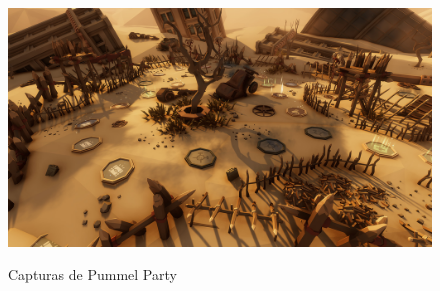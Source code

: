 \begin{figure}[H]
    \centering
    \begin{minipage}{0.40\textwidth}
        \centering
        \includegraphics[width=1.0\textwidth]{5-Cuerpo/Chapter3/PMP3.jpg} %
        \label{PMP-Paisaje}
    \end{minipage}
    \caption{Capturas de Pummel Party}
\end{figure}